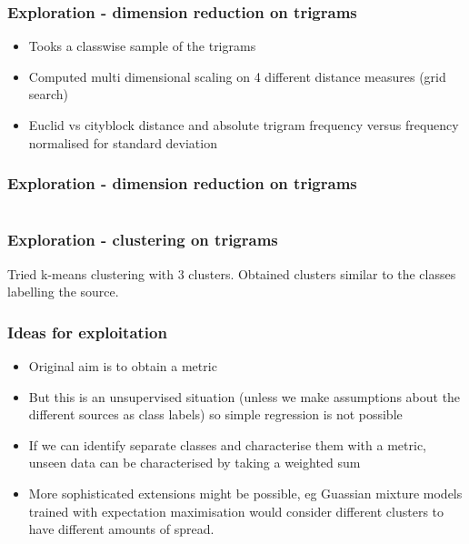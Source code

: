 \documentclass{beamer}
\begin{document}
\begin{frame}
  \frametitle{Exploration - dimension reduction on trigrams}
  \begin{itemize}
    \item Tooks a classwise sample of the trigrams\pause{}
    \item Computed multi dimensional scaling on 4 different distance measures (grid search)\pause{}
    \item Euclid vs cityblock distance and absolute trigram frequency versus frequency normalised for standard deviation
  \end{itemize}
\end{frame}

\begin{frame}
  \frametitle{Exploration - dimension reduction on trigrams}
  \begin{columns}[t]
    \begin{column}{0.5\textwidth}
      \vspace{-3em}
      
      \vspace{-3.5em}
      
    \end{column}
    \begin{column}{0.5\textwidth}
      \vspace{-3em}
      
      \vspace{-3em}
      
    \end{column}
  \end{columns}
\end{frame}

\begin{frame}
  \frametitle{Exploration - clustering on trigrams}
  Tried k-means clustering with 3 clusters. Obtained clusters similar to the classes labelling the source.
  {\centering
    
  }
\end{frame}

\begin{frame}
  \frametitle{Ideas for exploitation}
  \begin{itemize}
    \item Original aim is to obtain a metric\pause{}

    \item But this is an unsupervised situation (unless we make assumptions
      about the different sources as class labels) so simple regression is not
      possible\pause{}

    \item If we can identify separate classes and characterise them with a
      metric, unseen data can be characterised by taking a weighted sum\pause{}

    \item More sophisticated extensions might be possible, eg Guassian mixture
      models trained with expectation maximisation would consider different
      clusters to have different amounts of spread.
  \end{itemize}
\end{frame}
\end{document}

